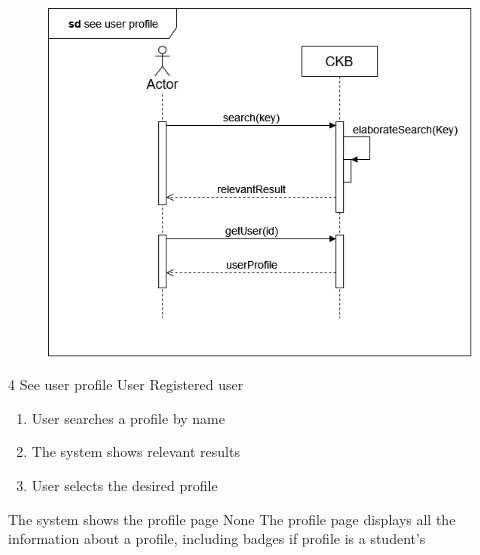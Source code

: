 \usecase
{
    \begin{figure}[H]
        \centering
        \includegraphics[width=\textwidth]{src/sd_diagrams/userprofile.png}
    \end{figure}
}
{4}
{See user profile} %
{User} %
{Registered user} %
{ %
    \begin{enumerate}
        \item User searches a profile by name
        \item The system shows relevant results
        \item User selects the desired profile
    \end{enumerate}
}
{The system shows the profile page} %
{ %
    None
}
{ %
The profile page displays all the information about a profile, including badges if profile is a student's
}


